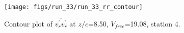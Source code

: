 \begin{figure}[H]
\centering
\texttt{[image: figs/run\_33/run\_33\_rr\_contour]}
\caption{Contour plot of $\overline{v_{r}^{\prime} v_{r}^{\prime}}$ at $z/c$=8.50, $V_{free}$=19.08, station 4.}
\label{fig:run_33_rr_contour}
\end{figure}


